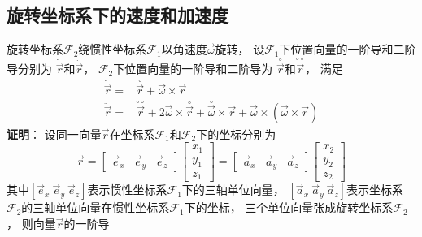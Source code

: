 \subsection{旋转坐标系下的速度和加速度}
旋转坐标系$\mathcal{F}_2$绕惯性坐标系$\mathcal{F}_1$以角速度$\vec{\omega}$旋转，
设$\mathcal{F}_1$下位置向量的一阶导和二阶导分别为
$\dot{\vec{r}}$和$\ddot{\vec{r}}$，
$\mathcal{F}_2$下位置向量的一阶导和二阶导为
$\overset{\circ}{\vec{r}}$和$\overset{\circ\circ}{\vec{r}}$，
满足
\begin{align*}
    \dot{\vec{r}}
    =& \overset{\circ}{\vec{r}}
    + \vec{\omega}\times\vec{r} \\
    \ddot{\vec{r}}
    =& \overset{\circ\circ}{\vec{r}}
    + 2\vec{\omega}\times\overset{\circ}{\vec{r}}
    + \overset{\circ}{\vec{\omega}}\times\vec{r}
    + \vec{\omega}\times(\vec{\omega}\times\vec{r})
\end{align*}
\textbf{证明}：
设同一向量$\vec{r}$在坐标系$\mathcal{F}_1$和$\mathcal{F}_2$下的坐标分别为
\begin{equation*}
    \vec{r} = \left[\begin{matrix}
        \vec{e}_x & \vec{e}_y & \vec{e}_z
    \end{matrix}\right]
    \left[\begin{matrix}
        x_1 \\ y_1 \\ z_1
    \end{matrix}\right]
    = \left[\begin{matrix}
        \vec{a}_x & \vec{a}_y & \vec{a}_z
    \end{matrix}\right]
    \left[\begin{matrix}
        x_2 \\ y_2 \\ z_2
    \end{matrix}\right]
\end{equation*}
其中$[\vec{e}_x\ \vec{e}_y\ \vec{e}_z]$表示惯性坐标系$\mathcal{F}_1$下的三轴单位向量，
$[\vec{a}_x\ \vec{a}_y\ \vec{a}_z]$表示坐标系$\mathcal{F}_2$的三轴单位向量在惯性坐标系$\mathcal{F}_1$下的坐标，
三个单位向量张成旋转坐标系$\mathcal{F}_2$，
则向量$\vec{r}$的一阶导
